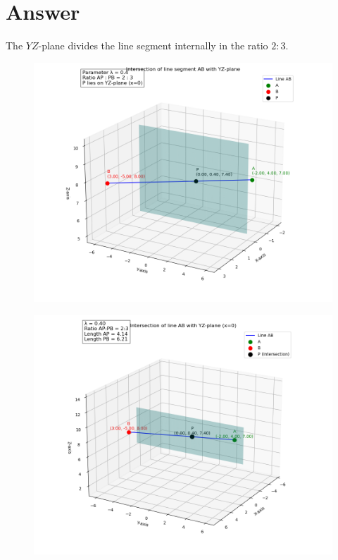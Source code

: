 \documentclass[journal]{IEEEtran}
\begin{document}
\section*{Answer}
The $YZ$-plane divides the line segment internally in the ratio $\boxed{2:3}$.
\begin{figure}[h]
    \centering
    \includegraphics[width=0.9\columnwidth]{figs/fig_61.png}
    \caption{}
    \label{fig:placeholder}
\end{figure}
\begin{figure}
    \centering
    \includegraphics[width=0.9\columnwidth]{figs/Fig -62.png}
    \caption{}
    \label{fig:placeholder}
\end{figure}
\end{document}
